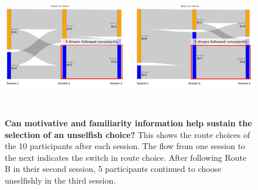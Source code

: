 

\begin{figure}[h]
\centering
  \includegraphics[scale=.45]{figures/s4-sustain-unselfish-results.png}
  \caption{\textbf{Can motivative and familiarity information help sustain the selection of an unselfish choice?} This shows the route choices of the 10 participants after each session. The flow from one session to the next indicates the switch in route choice. After following Route B in their second session, 5 participants continued to choose unselfishly in the third session.}~\label{fig:s4-sustain-unselfish-results}
\end{figure}

